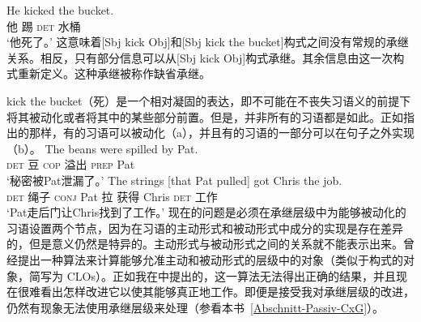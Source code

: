 \begin{exe}
\begin{xlist}[iv.]
\begin{exe}
\begin{xlist}[iv.]
\ea
\gll He kicked the bucket.\\
     他 踢 \textsc{det} 水桶\\
\glt `他死了。'
\z
这意味着[Sbj kick Obj]和[Sbj kick the bucket]构式之间没有常规的承继关系。相反，只有部分信息可以从[Sbj kick Obj]构式承继。其余信息由这一次构式重新定义。这种承继被称作缺省承继。

kick the bucket（死）是一个相对凝固的表达，即不可能在不丧失习语义的前提下将其被动化或者将其中的某些部分前置\citep*[]{NSW94a}。但是，并非所有的习语都是如此。正如\citet*[]{NSW94a}指出的那样，有的习语可以被动化（a），并且有的习语的一部分可以在句子之外实现（b）。
\eal
\ex 
\gll The beans were spilled by Pat.\\
     \textsc{det} 豆 \textsc{cop} 溢出 \textsc{prep} Pat\\
\glt `秘密被Pat泄漏了。'
\ex 
\gll The strings [that Pat pulled] got Chris the job.\\
     \textsc{det} 绳子 \spacebr{}\textsc{conj} Pat 拉 获得 Chris \textsc{det} 工作\\
\glt `Pat走后门让Chris找到了工作。'
\zl
%
%
现在的问题是必须在承继层级中为能够被动化的习语设置两个节点，因为在习语的主动形式和被动形式中成分的实现是存在差异的，但是意义仍然是特异的。主动形式与被动形式之间的关系就不能表示出来。\citet{Kay2002a}曾经提出一种算法来计算能够允准主动和被动形式的层级中的对象（类似于构式的对象，简写为 CLOs）。正如我在\citet[\S~3]{Mueller2006d}中提出的，这一算法无法得出正确的结果，并且现在很难看出怎样改进它以使其能够真正地工作。即便是接受我对承继层级的改进，仍然有现象无法使用承继层级来处理（参看本书~\ref{Abschnitt-Passiv-CxG}）。

\end{xlist}
\end{exe}
\end{xlist}
\end{exe}
